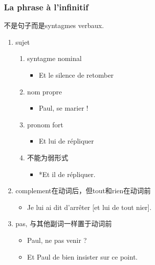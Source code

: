 \documentclass[UTF8]{report}
\begin{document}
\subsubsection{La phrase à l’infinitif}
不是句子而是syntagmes verbaux.
\begin{enumerate}
    \item sujet
    \begin{enumerate}
        \item syntagme nominal
        \begin{itemize}
            \item Et le silence de retomber 
        \end{itemize}
        \item nom propre
        \begin{itemize}
            \item Paul, se marier !
        \end{itemize}
        \item pronom fort
        \begin{itemize}
            \item Et lui de répliquer
        \end{itemize}
        \item 不能为弱形式
        \begin{itemize}
            \item *Et il de répliquer.
        \end{itemize}
    \end{enumerate}
    \item complement在动词后，但tout和rien在动词前
    \begin{itemize}
        \item Je lui ai dit d’arrêter [et lui de tout nier].
    \end{itemize}
    \item pas, 与其他副词一样置于动词前
    \begin{itemize}
        \item Paul, ne pas venir ?
        \item Et Paul de bien insister sur ce point.
    \end{itemize}
\end{enumerate}
\end{document}
